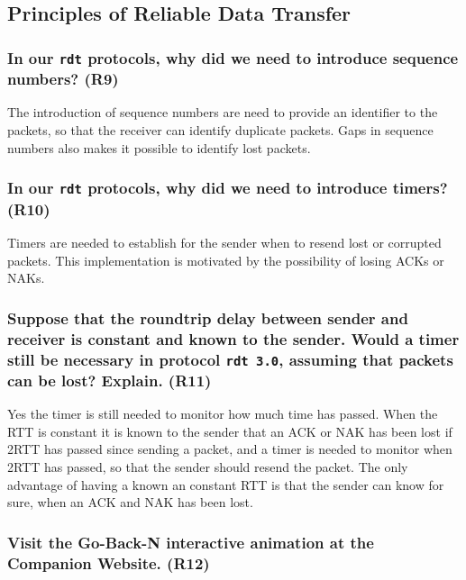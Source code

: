 \subsection{Principles of Reliable Data Transfer}


\subsubsection{In our \texttt{rdt} protocols, why did we need to introduce sequence numbers? (R9)}

The introduction of sequence numbers are need to provide an identifier to the packets, so that the receiver can identify duplicate packets. Gaps in sequence numbers also makes it possible to identify lost packets.


\subsubsection{In our \texttt{rdt} protocols, why did we need to introduce timers? (R10)}

Timers are needed to establish for the sender when to resend lost or corrupted packets. This implementation is motivated by the possibility of losing ACKs or NAKs.


\subsubsection{Suppose that the roundtrip delay between sender and receiver is constant and known to the sender. Would a timer still be necessary in protocol \texttt{rdt 3.0}, assuming that packets can be lost? Explain. (R11)}

Yes the timer is still needed to monitor how much time has passed. When the RTT is constant it is known to the sender that an ACK or NAK has been lost if 2RTT has passed since sending a packet, and a timer is needed to monitor when 2RTT has passed, so that the sender should resend the packet. The only advantage of having a known an constant RTT is that the sender can know for sure, when an ACK and NAK has been lost.


\subsubsection{Visit the Go-Back-N interactive animation at the Companion Website. (R12)}

